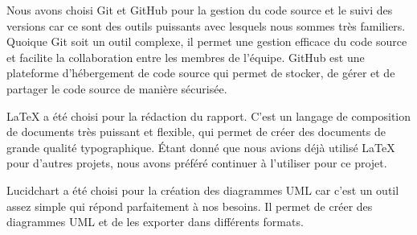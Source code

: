 Nous avons choisi Git et GitHub pour la gestion du code source et le suivi des
versions car ce sont des outils puissants avec lesquels nous sommes très
familiers. Quoique Git soit un outil complexe, il permet une gestion efficace
du code source et facilite la collaboration entre les membres de l'équipe. GitHub
est une plateforme d'hébergement de code source qui permet de stocker, de gérer
et de partager le code source de manière sécurisée.

LaTeX a été choisi pour la rédaction du rapport. C'est un langage de
composition de documents très puissant et flexible, qui permet de créer des
documents de grande qualité typographique.
Étant donné que nous avions déjà utilisé LaTeX pour d'autres projets, nous avons
préféré continuer à l'utiliser pour ce projet.

Lucidchart a été choisi pour la création des diagrammes UML car c'est un outil assez
simple qui répond parfaitement à nos besoins. Il permet de créer des diagrammes
UML et de les exporter dans différents formats.

